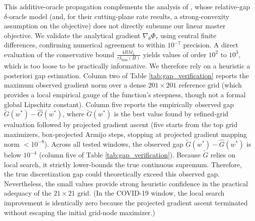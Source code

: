 \documentclass[smallextended]{svjour3}
\begin{document}
This additive-oracle propagation complements the analysis of \cite{oustry2025convex}, whose relative-gap $\delta$-oracle model (and, for their cutting-plane rate results, a strong-convexity assumption on the objective) does not directly subsume our linear master objective. We validate the analytical gradient $\nabla_\theta \Phi_\tau$ using central finite differences, confirming numerical agreement to within $10^{-7}$ precision. A direct evaluation of the conservative bound $\frac{4RM_L}{\tau\lambda_{\min}(H)}$ yields values of order $10^{2}$ to $10^{3}$, which is too loose to be practically informative. We therefore rely on a heuristic a posteriori gap estimation. Column two of Table \ref{tab:gap_verification} reports the maximum observed gradient norm over a dense $201\times201$ reference grid (which provides a local empirical gauge of the function's steepness, though not a formal global Lipschitz constant). Column five reports the empirically observed gap $\widetilde G(w^*) - \widehat G(w^*)$, where $\widetilde G(w^*)$ is the best value found by refined-grid evaluation followed by projected gradient ascent (five starts from the top grid maximizers, box-projected Armijo steps, stopping at projected gradient mapping norm $<10^{-8}$). Across all tested windows, the observed gap $\widetilde G(w^*) - \widehat G(w^*)$ is below $10^{-4}$ (column five of Table \ref{tab:gap_verification}). Because $\widetilde G$ relies on local search, it strictly lower-bounds the true continuous supremum. Therefore, the true discretization gap could theoretically exceed this observed gap. Nevertheless, the small values provide strong heuristic confidence in the practical adequacy of the $21\times21$ grid. (In the COVID-19 window, the local search improvement is identically zero because the projected gradient ascent terminated without escaping the initial grid-node maximizer.)

\begin{table}[htbp]
\centering
\caption{A posteriori gap estimation for the robust discretization}
\label{tab:gap_verification}
\end{table}
\end{document}
